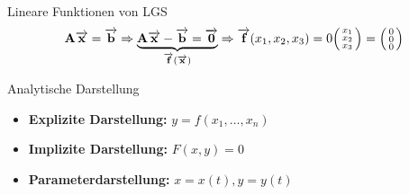 \begin{corollary}{Lineare Funktionen von LGS}
    $$\textbf{A} \overrightarrow{\textbf{x}} = \overrightarrow{\textbf{b}} \Rightarrow \underbrace{\textbf{A} \overrightarrow{\textbf{x}} - \overrightarrow{\textbf{b}} = \overrightarrow{\textbf{0}}}_{\overrightarrow{\textbf{f}}(\overrightarrow{\textbf{x}})} \Rightarrow \overrightarrow{\textbf{f}}(x_1, x_2, x_3) = 0 \begin{psmallmatrix} x_1 \\ x_2 \\ x_3 \end{psmallmatrix} = \begin{psmallmatrix} 0 \\ 0 \\ 0 \end{psmallmatrix}$$
\end{corollary}


\begin{concept}{Analytische Darstellung}
    \begin{itemize}
        \item \textbf{Explizite Darstellung:} $y = f(x_1, \ldots, x_n)$
        \item \textbf{Implizite Darstellung:} $F(x, y) = 0$
        \item \textbf{Parameterdarstellung:} $x = x(t), y = y(t)$
    \end{itemize}
\end{concept}

